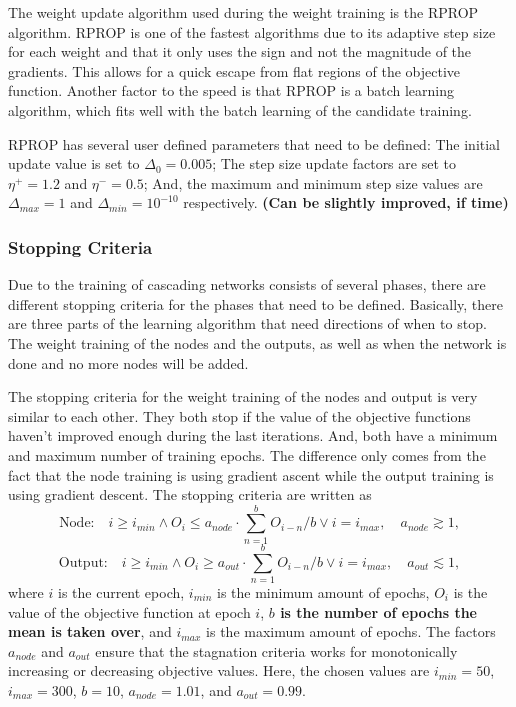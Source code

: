 \documentclass[a4paper,11pt, usenatbib]{article}
\begin{document}
The weight update algorithm used during the weight training is the RPROP algorithm\cite{riedmiller_rprop_1992, riedmiller_rprop_1994}. RPROP is one of the fastest algorithms due to its adaptive step size for each weight and that it only uses the sign and not the magnitude of the gradients. This allows for a quick escape from flat regions of the objective function. Another factor to the speed is that RPROP is a batch learning algorithm, which fits well with the batch learning of the candidate training. 

RPROP has several user defined parameters that need to be defined: The initial update value is set to $\Delta_0=0.005$; The step size update factors are set to $\eta^+=1.2$ and $\eta^-=0.5$; And, the maximum and minimum step size values are $\Delta_{max}=1$ and $\Delta_{min}=10^{-10}$ respectively. \textbf{(Can be slightly improved, if time)}

\subsubsection{Stopping Criteria}
\label{sssec:Stopping Criteria}
Due to the training of cascading networks consists of several phases, there are different stopping criteria for the phases that need to be defined. Basically, there are three parts of the learning algorithm that need directions of when to stop. The weight training of the nodes and the outputs, as well as when the network is done and no more nodes will be added. 

The stopping criteria for the weight training of the nodes and output is very similar to each other. They both stop if the value of the objective functions haven't improved enough during the last iterations. And, both have a minimum and maximum number of training epochs. The difference only comes from the fact that the node training is using gradient ascent while the output training is using gradient descent. The stopping criteria are written as 
\begin{equation}
\text{Node:}\quad    i\geq i_{min} \land O_i \leq a_{node}\cdot\sum_{n=1}^bO_{i-n}/b \lor i=i_{max}, \quad a_{node}\gtrsim 1,
\end{equation}
\begin{equation}
\text{Output:}\quad    i\geq i_{min} \land O_i \geq a_{out}\cdot\sum_{n=1}^bO_{i-n}/b \lor i=i_{max}, \quad a_{out}\lesssim 1,
\end{equation}
where $i$ is the current epoch, $i_{min}$ is the minimum amount of epochs, $O_i$ is the value of the objective function at epoch $i$,\textbf{ $b$ is the number of epochs the mean is taken over}, and $i_{max}$ is the maximum amount of epochs. The factors $a_{node}$ and $a_{out}$ ensure that the stagnation criteria works for monotonically increasing or decreasing objective values. Here, the chosen values are $i_{min}=50$, $i_{max}=300$, $b=10$, $a_{node}=1.01$, and $a_{out}=0.99$.
\end{document}
